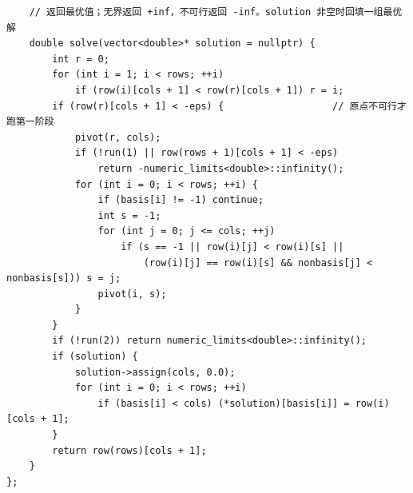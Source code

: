 \begin{verbatim}
    // 返回最优值；无界返回 +inf，不可行返回 -inf。solution 非空时回填一组最优解
    double solve(vector<double>* solution = nullptr) {
        int r = 0;
        for (int i = 1; i < rows; ++i)
            if (row(i)[cols + 1] < row(r)[cols + 1]) r = i;
        if (row(r)[cols + 1] < -eps) {                   // 原点不可行才跑第一阶段
            pivot(r, cols);
            if (!run(1) || row(rows + 1)[cols + 1] < -eps)
                return -numeric_limits<double>::infinity();
            for (int i = 0; i < rows; ++i) {
                if (basis[i] != -1) continue;
                int s = -1;
                for (int j = 0; j <= cols; ++j)
                    if (s == -1 || row(i)[j] < row(i)[s] ||
                        (row(i)[j] == row(i)[s] && nonbasis[j] < nonbasis[s])) s = j;
                pivot(i, s);
            }
        }
        if (!run(2)) return numeric_limits<double>::infinity();
        if (solution) {
            solution->assign(cols, 0.0);
            for (int i = 0; i < rows; ++i)
                if (basis[i] < cols) (*solution)[basis[i]] = row(i)[cols + 1];
        }
        return row(rows)[cols + 1];
    }
};
		\end{verbatim}

